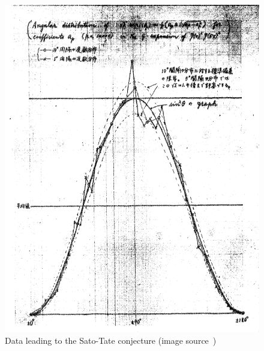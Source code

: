 \documentclass{llncs}
\begin{document}

\begin{figure}[h!]
  \centering
\includegraphics[scale=0.33]{sato_tate_data.pdf}
  \caption{Data leading to the Sato-Tate conjecture (image source~\cite{ST2})}
\label{fig:st}
\end{figure}

%


\end{document}

